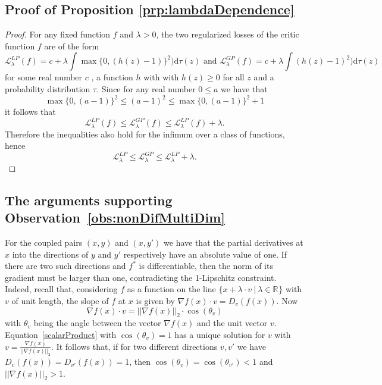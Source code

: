 \documentclass{article} %
\newcommand{\RR}[1][]{\mathbb{R}^{#1}}
\newcommand{\norm}[1]{||{#1}||_2}
\begin{document}
\subsection{Proof of Proposition \ref{prp:lambdaDependence}}\label{app:lambdaDependence}


\begin{proof}
For any fixed function $f$ and $\lambda >0$, the two regularized losses of the critic function $f$ are of the form 
$$\mathcal{L}_\lambda^{LP}(f)=c+\lambda \int \max\{0,(h(z)-1)\}^2)\text{d}\tau(z)\text{ and }\mathcal{L}_\lambda^{GP}(f)=c+\lambda \int (h(z)-1)^2)\text{d}\tau(z)$$ for some real number $c$ , a function $h$ with with $h(z)\geq 0$ for all $z$ and a probability distribution $\tau$. Since for any real number $0\leq a$ we have that
$$\max\{0,(a-1)\}^2 \leq (a-1)^2 \leq \max\{0,(a-1)\}^2 +1$$
it follows that 
$$\mathcal{L}_\lambda^{LP}(f)\leq \mathcal{L}_\lambda^{GP}(f)\leq \mathcal{L}_\lambda^{LP}(f) + \lambda.$$
Therefore the inequalities also hold for the infimum over a class of functions, hence
$$\mathcal{L}_\lambda^{LP}\leq \mathcal{L}_\lambda^{GP}\leq \mathcal{L}_\lambda^{LP} + \lambda.$$
\end{proof}




\subsection{The arguments supporting Observation~\ref{obs:nonDifMultiDim}}\label{app:nonDifMultiDim}

For the coupled pairs $(x,y)$ and $(x,y')$ we have that the partial derivatives at $x$ into the directions of $y$ and $y'$ respectively have an absolute value of one. If there are two such directions and $f^*$ is differentiable, then the norm of its gradient must be larger than one, contradicting the 1-Lipschitz constraint. Indeed, recall that, considering $f$ as a function on the line $\{x+\lambda\cdot v\ |\ \lambda\in\RR\}$ with $v$ of unit length, the slope of $f$ at $x$ is given by $\nabla f(x) \cdot v = D_v(f(x)).$ Now 
\begin{equation}\label{scalarProduct} \nabla f(x) \cdot v=\norm{\nabla f(x)}\cdot  \cos(\theta_v)\end{equation}
with $\theta_v$ being the angle between the vector $\nabla f(x)$ and the unit vector $v$. Equation~\eqref{scalarProduct} with $\cos(\theta_v)=1$ has a unique solution for $v$ with $v=\frac{\nabla f(x)}{\norm{\nabla f(x)}}$. It follows that, if for two different directions $v,v'$ we have $D_v(f(x))=D_{v'}(f(x))=1$, then $\cos(\theta_v)=\cos(\theta_{v'})<1$ and $\norm{\nabla f(x)}>1$. 
\end{document}
